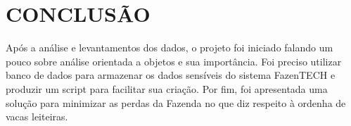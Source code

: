 
\chapter{CONCLUSÃO}
\label{chap:conclusao}

Após a análise e levantamentos dos dados, o projeto foi iniciado falando um pouco sobre análise orientada a objetos e sua importância. Foi preciso utilizar banco de dados para armazenar os dados sensíveis do sistema FazenTECH e produzir um script para facilitar sua criação.
Por fim, foi apresentada uma solução para minimizar as perdas da Fazenda no que diz respeito à ordenha de vacas leiteiras. 



